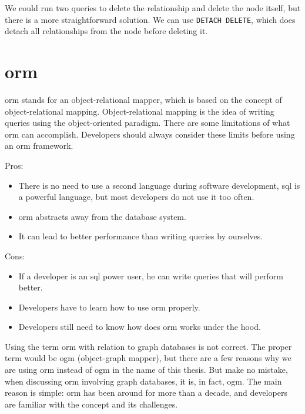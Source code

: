 We could run two queries to delete the relationship and delete the node itself, but there is a more straightforward solution.
We can use \texttt{DETACH DELETE}, which does detach all relationships from the node before deleting it.

\section{\acrshort{orm}}
\acrshort{orm} stands for an object-relational mapper, which is based on the concept of object-relational mapping.
Object-relational mapping is the idea of writing queries using the object-oriented paradigm.
There are some limitations of what \acrshort{orm} can accomplish. Developers should always consider these limits before using an \acrshort{orm} framework. \cite{mario_hoyos_what_2018}

\noindent Pros:
\begin{itemize}
    \item There is no need to use a second language during software development, \acrshort{sql} is a powerful language, but most developers do not use it too often.
    \item \acrshort{orm} abstracts away from the database system.
    \item It can lead to better performance than writing queries by ourselves.
\end{itemize}
Cons:
\begin{itemize}
    \item If a developer is an \acrshort{sql} power user, he can write queries that will perform better.
    \item Developers have to learn how to use \acrshort{orm} properly.
    \item Developers still need to know how does \acrshort{orm} works under the hood.
\end{itemize}

Using the term \acrshort{orm} with relation to graph databases is not correct. The proper term would be \acrshort{ogm} (object-graph mapper),
but there are a few reasons why we are using \acrshort{orm} instead of \acrshort{ogm} in the name of this thesis. But make no mistake,
when discussing \acrshort{orm} involving graph databases, it is, in fact, \acrshort{ogm}.
The main reason is simple: \acrshort{orm} has been around for more than a decade, and developers are familiar with the concept and its challenges.

